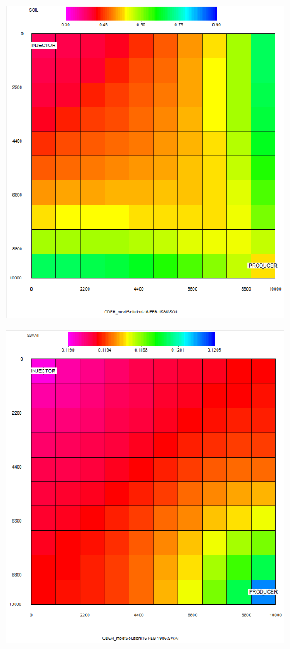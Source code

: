 \centerline{\includegraphics[width=0.8\textwidth]{graphics/grid_soil_z1.PNG}}

\centerline{\includegraphics[width=0.8\textwidth]{graphics/grid_swat_z1.PNG}}





